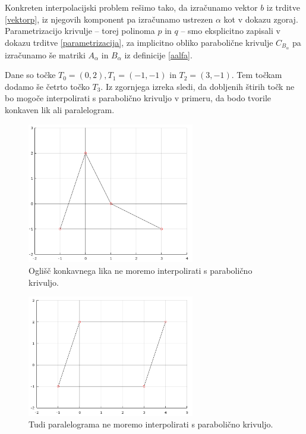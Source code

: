 \documentclass[mat1]{fmfdelo}
\newcommand{\al}{\alpha}
\begin{document}
Konkreten interpolacijski problem rešimo tako, da izračunamo vektor $b$ iz trditve \ref{vektorp}, iz njegovih komponent pa izračunamo ustrezen $\al$ kot v dokazu zgoraj. Parametrizacijo krivulje -- torej polinoma $p$ in $q$ -- smo eksplicitno zapisali v dokazu trditve \ref{parametrizacija}, za implicitno obliko parabolične krivulje $C_{B_\al}$ pa izračunamo še matriki $A_\al$ in $B_\al$ iz definicije \ref{aalfa}.
%
\begin{primer}
Dane so točke $T_0 = (0, 2), T_1 = (-1, -1)$ in $T_2 = (3, -1).$
Tem točkam dodamo še četrto točko $T_3$. Iz zgornjega izreka sledi, da dobljenih štirih točk ne bo mogoče interpolirati s parabolično krivuljo v primeru, da bodo tvorile konkaven lik ali paralelogram. 
%
\begin{figure}[h!]
  \centering
      \includegraphics[width=0.65\textwidth]{okonk.png}
  \caption{Oglišč konkavnega lika ne moremo interpolirati s parabolično krivuljo.}
  \label{fig:slikakonk}
\end{figure}
%
\begin{figure}[h]
  \centering
      \includegraphics[width=0.65\textwidth]{opara.png}
  \caption{Tudi paralelograma ne moremo interpolirati s parabolično krivuljo.}
  \label{fig:slikapara}
  \end{figure}

\end{primer}
\end{document}
